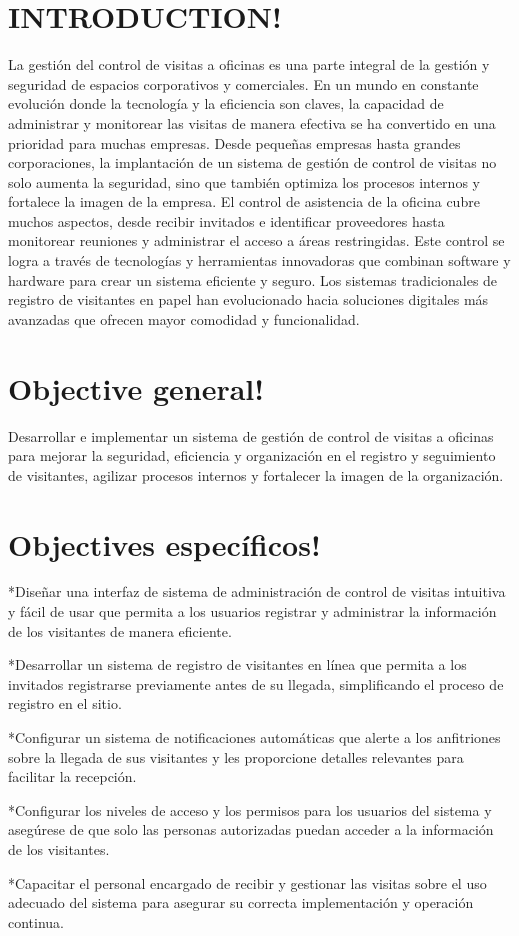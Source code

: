 \documentclass[10pt,a4paper]{article}
\begin{document}
\section{INTRODUCTION!}
La gestión del control de visitas a oficinas es una parte integral de la gestión y seguridad de espacios corporativos y comerciales. En un mundo en constante evolución donde la tecnología y la eficiencia son claves, la capacidad de administrar y monitorear las visitas de manera efectiva se ha convertido en una prioridad para muchas empresas. Desde pequeñas empresas hasta grandes corporaciones, la implantación de un sistema de gestión de control de visitas no solo aumenta la seguridad, sino que también optimiza los procesos internos y fortalece la imagen de la empresa.
El control de asistencia de la oficina cubre muchos aspectos, desde recibir invitados e identificar proveedores hasta monitorear reuniones y administrar el acceso a áreas restringidas. Este control se logra a través de tecnologías y herramientas innovadoras que combinan software y hardware para crear un sistema eficiente y seguro. Los sistemas tradicionales de registro de visitantes en papel han evolucionado hacia soluciones digitales más avanzadas que ofrecen mayor comodidad y funcionalidad.

\section{Objective general!}
Desarrollar e implementar un sistema de gestión de control de visitas a oficinas para mejorar la seguridad, eficiencia y organización en el registro y seguimiento de visitantes, agilizar procesos internos y fortalecer la imagen de la organización.

\section{Objectives específicos!}
*Diseñar una interfaz de sistema de administración de control de visitas intuitiva y fácil de usar que permita a los usuarios registrar y administrar la información de los visitantes de manera eficiente.

*Desarrollar un sistema de registro de visitantes en línea que permita a los invitados registrarse previamente antes de su llegada, simplificando el proceso de registro en el sitio.

*Configurar un sistema de notificaciones automáticas que alerte a los anfitriones sobre la llegada de sus visitantes y les proporcione detalles relevantes para facilitar la recepción.

*Configurar los niveles de acceso y los permisos para los usuarios del sistema y asegúrese de que solo las personas autorizadas puedan acceder a la información de los visitantes.

*Capacitar el personal encargado de recibir y gestionar las visitas sobre el uso adecuado del sistema para asegurar su correcta implementación y operación continua.
\end{document}
